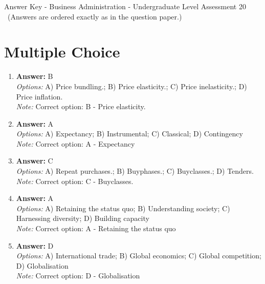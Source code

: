 \documentclass[12pt]{article}
\begin{document}
\begin{center}
Answer Key - Business Administration - Undergraduate Level Assessment 20 \
\small (Answers are ordered exactly as in the question paper.)
\end{center}

\section*{Multiple Choice}
\begin{enumerate}[label=\arabic*.]
\item \textbf{Answer:} B
\\ \textit{Options:} A) Price bundling.; B) Price elasticity.; C) Price inelasticity.; D) Price inflation.
\\ \textit{Note:} Correct option: B - Price elasticity.
\item \textbf{Answer:} A
\\ \textit{Options:} A) Expectancy; B) Instrumental; C) Classical; D) Contingency
\\ \textit{Note:} Correct option: A - Expectancy
\item \textbf{Answer:} C
\\ \textit{Options:} A) Repeat purchases.; B) Buyphases.; C) Buyclasses.; D) Tenders.
\\ \textit{Note:} Correct option: C - Buyclasses.
\item \textbf{Answer:} A
\\ \textit{Options:} A) Retaining the status quo; B) Understanding society; C) Harnessing diversity; D) Building capacity
\\ \textit{Note:} Correct option: A - Retaining the status quo
\item \textbf{Answer:} D
\\ \textit{Options:} A) International trade; B) Global economics; C) Global competition; D) Globalisation
\\ \textit{Note:} Correct option: D - Globalisation
\end{enumerate}
\end{document}
